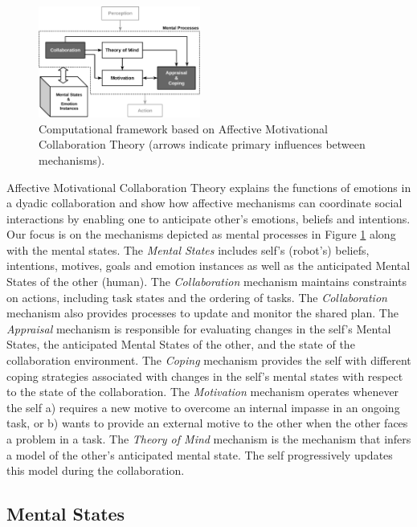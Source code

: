 \documentclass[letterpaper]{article}
\begin{document}
\begin{figure}[tbh]
  \centering
  \includegraphics[width=0.474\textwidth]{figure/theory-general-croped.pdf}
  \caption{{\fontsize{9}{9}\selectfont Computational framework based on
  Affective Motivational Collaboration Theory (arrows indicate primary
  influences between mechanisms).}}
  \label{fig:cpm}
\end{figure}

Affective Motivational Collaboration Theory explains the functions of emotions
in a dyadic collaboration and show how affective mechanisms can coordinate
social interactions by enabling one to anticipate other's emotions, beliefs and
intentions. Our focus is on the mechanisms depicted as mental processes in
Figure \ref{fig:cpm} along with the mental states. The \textit{Mental States}
includes self's (robot's) beliefs, intentions, motives, goals and emotion
instances as well as the anticipated Mental States of the other (human). The
\textit{Collaboration} mechanism maintains constraints on actions, including
task states and the ordering of tasks. The \textit{Collaboration} mechanism also
provides processes to update and monitor the shared plan. The \textit{Appraisal}
mechanism is responsible for evaluating changes in the self's Mental States, the
anticipated Mental States of the other, and the state of the collaboration
environment. The \textit{Coping} mechanism provides the self with different
coping strategies associated with changes in the self's mental states with
respect to the state of the collaboration. The \textit{Motivation} mechanism
operates whenever the self a) requires a new motive to overcome an internal
impasse in an ongoing task, or b) wants to provide an external motive to the
other when the other faces a problem in a task. The \textit{Theory of Mind}
mechanism is the mechanism that infers a model of the other's anticipated mental
state. The self progressively updates this model during the collaboration.

\subsection{Mental States}
\label{sec:mental-states}
\end{document}
